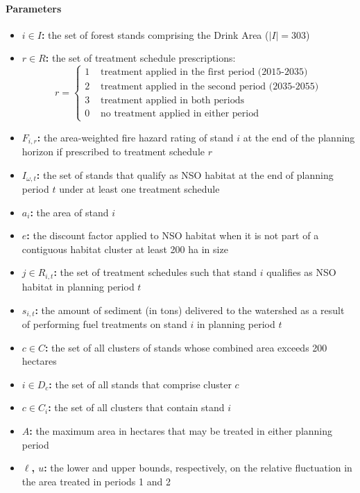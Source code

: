 \paragraph{Parameters}
\begin{itemize}
\item \textbf{$i \in I$:} the set of forest stands comprising the Drink Area ($|I| = 303$)
\item \textbf{$r \in R$:} the set of treatment schedule prescriptions:
	$$
	r =
	\begin{cases}
	1 &\text{ treatment applied in the first period (2015-2035)}\\
	2 &\text{ treatment applied in the second period (2035-2055)}\\
	3 &\text{ treatment applied in both periods}\\
	0 &\text{ no treatment applied in either period}
	\end{cases}
	$$
\item \textbf{$F_{i,r}$:} the area-weighted fire hazard rating of stand $i$ at the end of the planning horizon if prescribed to treatment schedule $r$
\item \textbf{$I_{\omega,t}$:} the set of stands that qualify as NSO habitat at the end of planning period $t$ under at least one treatment schedule
\item \textbf{$a_i$:} the area of stand $i$
\item \textbf{$e$:} the discount factor applied to NSO habitat when it is not part of a contiguous habitat cluster at least 200 ha in size
\item \textbf{$j \in R_{i,t}$:} the set of treatment schedules such that stand $i$ qualifies as NSO habitat in planning period $t$
\item \textbf{$s_{i,t}$:} the amount of sediment (in tons) delivered to the watershed as a result of performing fuel treatments on stand $i$ in planning period $t$
\item \textbf{$c \in C$:} the set of all clusters of stands whose combined area exceeds 200 hectares
\item \textbf{$i \in D_c$:} the set of all stands that comprise cluster $c$
\item \textbf{$c \in C_i$:} the set of all clusters that contain stand $i$
\item \textbf{$A$:} the maximum area in hectares that may be treated in either planning period
\item \textbf{$\ell$, $u$:} the lower and upper bounds, respectively, on the relative fluctuation in the area treated in periods 1 and 2
\end{itemize}

